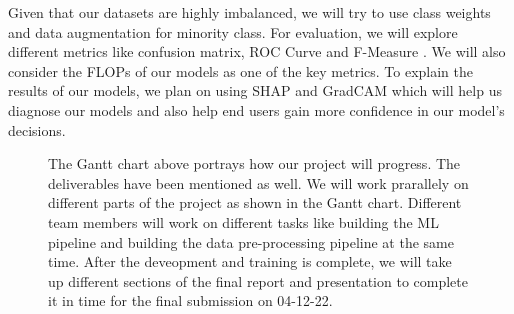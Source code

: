 \documentclass[10pt,twocolumn,letterpaper]{article}
\begin{document}
Given that our datasets are highly imbalanced, we will try to use class weights and 
data augmentation for minority class\cite{smote}.   
For evaluation, we will explore different metrics like confusion matrix, 
ROC Curve and F-Measure \cite{fmeasure}. 
We will also consider the FLOPs of our models 
as one of the key metrics. To explain the results of our models, 
we plan on using SHAP \cite{NIPS2017_8a20a862} and GradCAM \cite{jacobgilpytorchcam} which will help us diagnose our 
models and also help end users gain more confidence in our model's decisions.
\clearpage
\begin{figure}
  \vspace{14cm}
  \hspace{0.75cm}
\caption{The Gantt chart above portrays how our project will progress. 
The deliverables have been mentioned as well. We will work 
prarallely on different parts of the project as shown in the Gantt chart. 
Different team members will work on different tasks like building 
the ML pipeline and building the data pre-processing pipeline at the same time. 
After the deveopment and training is complete, we will take up 
different sections of the final report and presentation to complete 
it in time for the final submission on 04-12-22.}
\end{figure}

\clearpage
{\small


}
\end{document}
